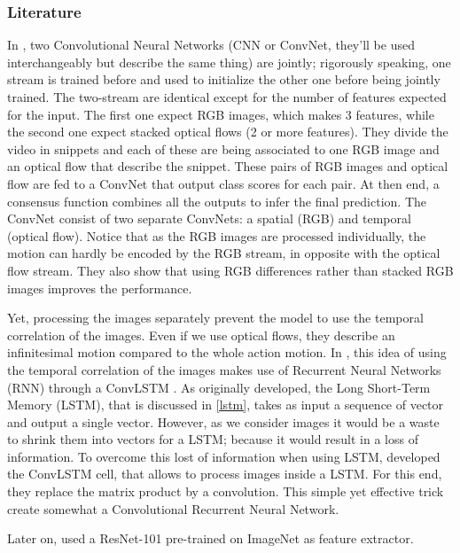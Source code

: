 \documentclass[12pt, a4paper]{report}
\begin{document}
				\subsubsection{Literature}\label{literature}
					In \cite{wang2016temporal}, two Convolutional Neural Networks (CNN or ConvNet, they'll be used interchangeably but describe the same thing) are \gls{jointly}; rigorously speaking, one stream is trained before and used to initialize the other one before being jointly trained.
					The two-stream are identical except for the number of features expected for the input.
					The first one expect RGB images, which makes 3 features, while the second one expect stacked optical flows (2 or more features).
					They divide the video in snippets and each of these are being associated to one RGB image and an optical flow that describe the snippet.
					These pairs of RGB images and optical flow are fed to a ConvNet that output class scores for each pair.
					At then end, a consensus function combines all the outputs to infer the final prediction.
					The ConvNet consist of two separate ConvNets: a spatial (RGB) and temporal (optical flow).
					Notice that as the RGB images are processed individually, the motion can hardly be encoded by the RGB stream, in opposite with the optical flow stream.
					They also show that using RGB differences rather than stacked RGB images improves the performance.
					\par
					Yet, processing the images separately prevent the model to use the temporal correlation of the images.
					Even if we use optical flows, they describe an infinitesimal motion compared to the whole action motion.
					In \cite{ye2019two}, this idea of using the temporal correlation of the images makes use of Recurrent Neural Networks (RNN) through a ConvLSTM \cite{shi2015convolutional}.
					As originally developed, the Long Short-Term Memory (LSTM), that is discussed in \ref{lstm}, takes as input a sequence of vector and output a single vector.
					However, as we consider images it would be a waste to shrink them into vectors for a LSTM; because it would result in a loss of information.
					To overcome this lost of information when using LSTM, \cite{shi2015convolutional} developed the ConvLSTM cell, that allows to process images inside a LSTM.
					For this end, they replace the matrix product by a convolution.
					This simple yet effective trick create somewhat a Convolutional Recurrent Neural Network.
					\par
					Later on, \cite{ye2019two} used a ResNet-101 pre-trained on ImageNet as feature extractor.
\end{document}
